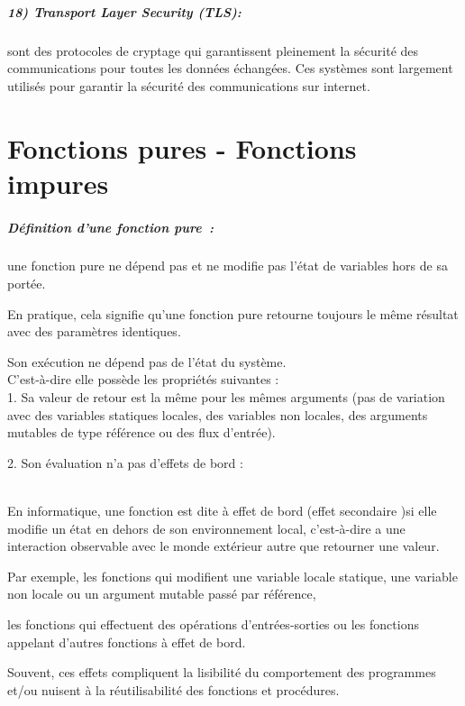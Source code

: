 \documentclass[12pt,titlepage]{report}
\begin{document}
\subsubsection{18) Transport Layer Security (TLS):} sont des protocoles de cryptage qui garantissent pleinement la sécurité des communications pour toutes les données échangées. Ces systèmes sont largement utilisés pour garantir la sécurité des communications sur internet. \\
  \part {Fonctions pures - Fonctions impures}

\subsubsection{Définition d’une fonction pure :}

une fonction pure ne dépend pas et ne modifie pas l'état de variables hors de sa portée.

En pratique, cela signifie qu'une fonction pure retourne toujours le même résultat avec des paramètres identiques.

Son exécution ne dépend pas de l’état du système.\\

C'est-à-dire elle possède  les propriétés suivantes :\\

1.	Sa valeur de retour est la même pour les mêmes arguments (pas de variation avec des variables statiques locales, des variables non locales, des arguments mutables de type référence ou des flux d'entrée).

2.	Son évaluation n'a pas d'effets de bord :

\\En informatique, une fonction est dite à effet de bord (effet secondaire )si elle modifie un état en dehors de son environnement local, c'est-à-dire a une interaction observable avec le monde extérieur autre que retourner une valeur.

Par exemple, les fonctions qui modifient une variable locale statique, une variable non locale ou un argument mutable passé par référence,

les fonctions qui effectuent des opérations d'entrées-sorties ou les fonctions appelant d'autres fonctions à effet de bord.

Souvent, ces effets compliquent la lisibilité du comportement des programmes et/ou nuisent à la réutilisabilité des fonctions et procédures.\\
\end{document}
